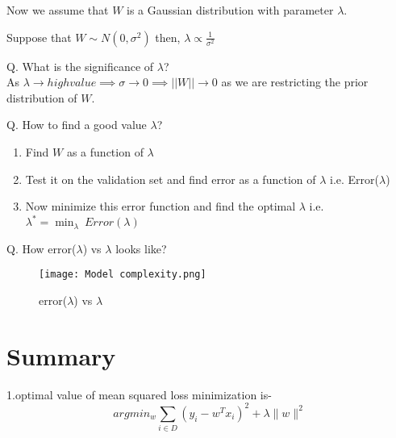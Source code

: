 \documentclass[11pt, twosides]{article}
\begin{document}
Now we assume that $W$ is a Gaussian distribution with parameter $\lambda$.

Suppose that $W \sim N(0,\sigma^2)$ then, $\lambda \propto \frac{1}{\sigma^2}$

\begin{flushleft}
Q. What is the significance of $\lambda$?\\
\color{blue}
As $\lambda \rightarrow high value \implies \sigma \rightarrow 0 \implies ||W|| \rightarrow 0$ as we are restricting the prior distribution of $W$. 
\end{flushleft}

\begin{flushleft}
Q. How to find a good value $\lambda$?\\
\color{blue}
\begin{enumerate}
    \item Find $W$ as a function of $\lambda$
    \item Test it on the validation set and find error as a function of $\lambda$ i.e. Error($\lambda$)
    \item Now minimize this error function and find the optimal $\lambda$ i.e. $\lambda^* = \min_\lambda \ Error(\lambda)$
\end{enumerate}
\end{flushleft}

Q. How error($\lambda$) vs $\lambda$ looks like?\\

\begin{figure}[h]
    \centering
    \texttt{[image: Model complexity.png]}
    \caption{error($\lambda$) vs $\lambda$}
\end{figure}
\section{Summary}
1.optimal value of mean squared loss minimization is-
$$ argmin_w \sum_{i \in D} (y_i- w^Tx_i)^2 + \lambda \|w\|^2$$
\end{document}
